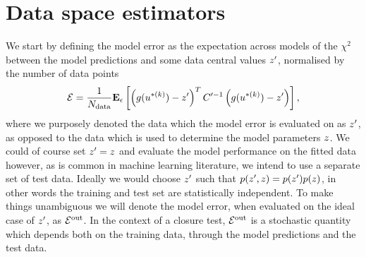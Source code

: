 \section{Data space estimators}

We start by defining the model error as the expectation across models of the
$\chi^2$ between the model predictions and some data central values
$z^\prime$, normalised by the number of data points
\begin{equation}\label{eq:chi2kerep}
    \mathcal{E} = \frac{1}{N_{\rm data}} \mathbf{E}_{\epsilon}\left[ 
        \left( g(u^{* (k)}) - z^\prime \right)^T
        C^{\prime -1}
        \left( g(u^{* (k)}) - z^\prime \right)
     \right],
\end{equation}
where we purposely denoted the data which the model error is evaluated on as
$z^\prime$, as opposed to the data which is used to determine the model
parameters $z$. We could of course set $z^\prime = z$ and
evaluate the model performance on the fitted data however, as is common in
machine learning literature, we intend to use a separate set of test data.
Ideally we would choose $z^\prime$ such that $p(z^\prime, z) =
p(z^\prime)p(z)$, in other words the training and test set are
statistically independent. To make things unambiguous we will denote the model
error, when evaluated on the ideal case of $z^\prime$, as $\mathcal{E}^{\rm out}$. In the
context of a closure test, $\mathcal{E}^{\rm out}$ is a stochastic quantity which depends both
on the training data, through the model predictions and the test data.

